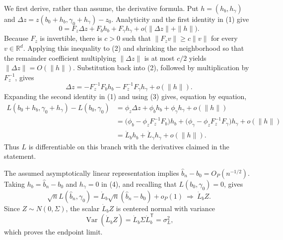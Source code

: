 We first derive, rather than assume, the derivative formula.  Put \(h=(h_b,h_\gamma)\) and \(\Delta z=z(b_0+h_b,\gamma_0+h_\gamma)-z_0\).  Analyticity and the first identity in (1) give
\[
0=F_z\Delta z+F_bh_b+F_\gamma h_\gamma
+o\bigl(\|\Delta z\|+\|h\|\bigr).
\tag{2}
\]
Because \(F_z\) is invertible, there is \(c>0\) such that \(\|F_zv\|\geq c\|v\|\) for every \(v\in\mathbb R^d\).  Applying this inequality to (2) and shrinking the neighborhood so that the remainder coefficient multiplying \(\|\Delta z\|\) is at most \(c/2\) yields \(\|\Delta z\|=O(\|h\|)\).  Substitution back into (2), followed by multiplication by \(F_z^{-1}\), gives
\[
\Delta z=-F_z^{-1}F_bh_b-F_z^{-1}F_\gamma h_\gamma+o(\|h\|).
\tag{3}
\]
Expanding the second identity in (1) and using (3) gives, equation by equation,
\[
\begin{aligned}
L(b_0+h_b,\gamma_0+h_\gamma)-L(b_0,\gamma_0)
&=\phi_z\Delta z+\phi_bh_b+\phi_\gamma h_\gamma+o(\|h\|)\\
&=\bigl(\phi_b-\phi_zF_z^{-1}F_b\bigr)h_b
+\bigl(\phi_\gamma-\phi_zF_z^{-1}F_\gamma\bigr)h_\gamma
+o(\|h\|)\\
&=\dot L_bh_b+\dot L_\gamma h_\gamma+o(\|h\|).
\end{aligned}
\tag{4}
\]
Thus \(L\) is differentiable on this branch with the derivatives claimed in the statement.

The assumed asymptotically linear representation implies \(\widehat b_n-b_0=O_P(n^{-1/2})\).  Taking \(h_b=\widehat b_n-b_0\) and \(h_\gamma=0\) in (4), and recalling that \(L(b_0,\gamma_0)=0\), gives
\[
\sqrt nL(\widehat b_n,\gamma_0)
=\dot L_b\sqrt n(\widehat b_n-b_0)+o_P(1)
\ \Longrightarrow\ \dot L_bZ.
\tag{5}
\]
Since \(Z\sim N(0,\Sigma)\), the scalar \(\dot L_bZ\) is centered normal with variance
\[
\operatorname{Var}(\dot L_bZ)=\dot L_b\Sigma\dot L_b^{\mathsf T}=\sigma_L^2,
\tag{6}
\]
which proves the endpoint limit.

